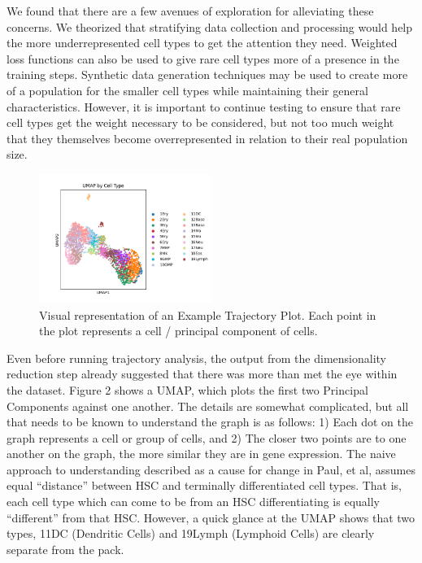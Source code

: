 \documentclass{article}
\begin{document}
We found that there are a few avenues of exploration for alleviating these concerns. We theorized that stratifying data collection and processing would help the more underrepresented cell types to get the attention they need. Weighted loss functions can also be used to give rare cell types more of a presence in the training steps. Synthetic data generation techniques may be used to create more of a population for the smaller cell types while maintaining their general characteristics. However, it is important to continue testing to ensure that rare cell types get the weight necessary to be considered, but not too much weight that they themselves become overrepresented in relation to their real population size. 


\begin{figure}[h]
\centering
\includegraphics[width=0.5\textwidth]{./images/umap_cell_types.png}
\caption{Visual representation of an Example Trajectory Plot. Each point in the plot represents a cell / principal component of cells.}
\end{figure}


Even before running trajectory analysis, the output from the dimensionality reduction step already suggested that there was more than met the eye within the dataset. Figure 2 shows a UMAP, which plots the first two Principal Components against one another. The details are somewhat complicated, but all that needs to be known to understand the graph is as follows: 1) Each dot on the graph represents a cell or group of cells, and 2) The closer two points are to one another on the graph, the more similar they are in gene expression. The naive approach to understanding described as a cause for change in Paul, et al, assumes equal “distance” between HSC and terminally differentiated cell types. That is, each cell type which can come to be from an HSC differentiating is equally “different” from that HSC. However, a quick glance at the UMAP shows that two types, 11DC (Dendritic Cells) and 19Lymph (Lymphoid Cells) are clearly separate from the pack. 
\end{document}
